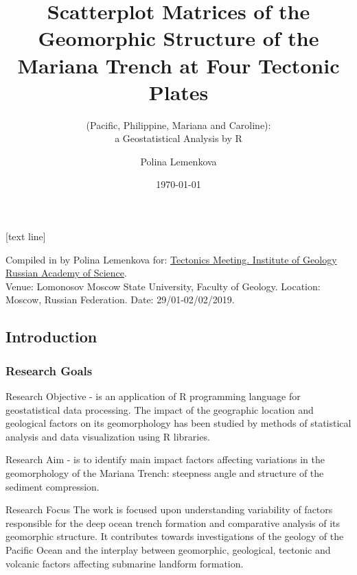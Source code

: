 \documentclass[pdflatex,compress,10pt,
	xcolor={dvipsnames,dvipsnames,svgnames,x11names,table},
	hyperref={colorlinks = true,breaklinks = true, urlcolor = NavyBlue, breaklinks = true}]{beamer}
\title{Scatterplot Matrices of the Geomorphic Structure of the Mariana Trench at Four Tectonic Plates}
\subtitle{(Pacific, Philippine, Mariana and Caroline): \\a Geostatistical Analysis by R}
\author{Polina Lemenkova}
\institute{Ocean University of China, College of Marine Geo-Sciences}
\date{\today}
\begin{document}
\maketitle

[text line]{%
\parbox{\linewidth}{\vspace*{-8pt}Compiled in \LuaLaTeX \space by Polina Lemenkova for: \href{http://www.ginras.ru/struct/5/20/index.php}{ Tectonics Meeting. Institute of Geology Russian Academy of Science}.\\ Venue: Lomonosov Moscow State University, Faculty of Geology. Location: Moscow, Russian Federation. Date: 29/01-02/02/2019.} \hfill\insertpagenumber}




\subsection{Introduction}

\begin{frame}\frametitle{Research Goals}
	\begin{exampleblock}{Research Objective}
- is an application of R programming language for geostatistical data processing. The impact of the geographic location and geological factors on its geomorphology has been studied by methods of statistical analysis and data visualization using R libraries.
	\end{exampleblock}
	\begin{exampleblock}{Research Aim}
- is to identify main impact factors affecting variations in the geomorphology of the Mariana Trench: steepness angle and structure of the sediment compression. 
	\end{exampleblock}
	\begin{alertblock}{Research Focus}
The work is focused upon understanding variability of factors responsible for the deep ocean trench formation and comparative analysis of its geomorphic structure. It contributes towards investigations of the geology of the Pacific Ocean and the interplay between geomorphic, geological, tectonic and volcanic factors affecting submarine landform formation.
	\end{alertblock}
\end{frame}
	
\end{document}
